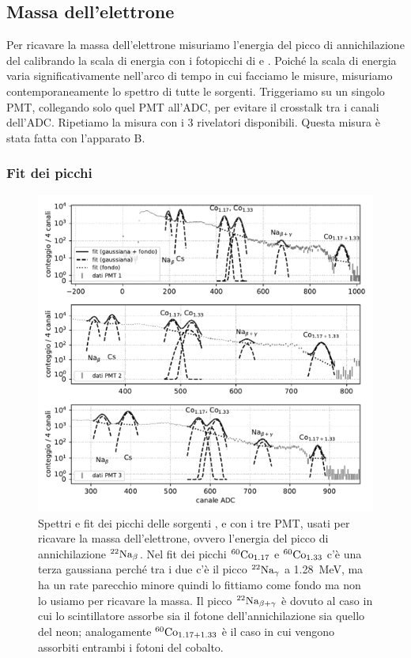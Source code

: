 \subsection{Massa dell'elettrone}

Per ricavare la massa dell'elettrone misuriamo l'energia del picco di annichilazione del \na{}
calibrando la scala di energia con i fotopicchi di \co{} e \cs{}.
Poiché la scala di energia varia significativamente nell'arco di tempo in cui facciamo le misure,
misuriamo contemporaneamente lo spettro di tutte le sorgenti.
Triggeriamo su un singolo PMT,
collegando solo quel PMT all'ADC, per evitare il crosstalk tra i canali dell'ADC.
Ripetiamo la misura con i 3 rivelatori disponibili.
Questa misura è stata fatta con l'apparato B.

\subsubsection{Fit dei picchi}

\begin{figure}
	\includegraphics[width=\textwidth]{immagini/mass18-peaks}
	\caption{\label{fig:mass18-peaks}
	Spettri e fit dei picchi delle sorgenti \na{}, \cs{} e \co{} con i tre PMT,
	usati per ricavare la massa dell'elettrone,
	ovvero l'energia del picco di annichilazione $^{\text{22}}\text{Na}_\beta$.
	Nel fit dei picchi $^{\text{60}}\text{Co}_{1.17}$ e $^{\text{60}}\text{Co}_{1.33}$ c'è una terza gaussiana
	perché tra i due c'è il picco $^{\text{22}}\text{Na}_\gamma$ a \SI{1.28}{MeV},
	ma ha un rate parecchio minore quindi lo fittiamo come fondo ma non lo usiamo per ricavare la massa.
	Il picco $^{\text{22}}\text{Na}_{\beta+\gamma}$ è dovuto al caso in cui lo scintillatore
	assorbe sia il fotone dell'annichilazione sia quello del neon;
	analogamente $^{\text{60}}\text{Co}_{1.17+1.33}$ è il caso in cui vengono assorbiti entrambi i fotoni del cobalto.}
\end{figure}

